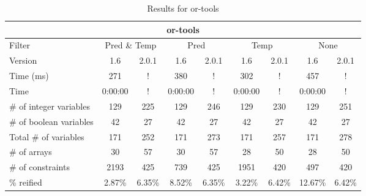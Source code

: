 \documentclass{standalone}
\begin{document}
\begin{table}[H]
\footnotesize
\centering
\begin{tabular}{lc|c|c|c|c|c|c|c}
\multicolumn{9}{c}{or-tools} \\ 
\hline\hline Filter & \multicolumn{2}{c|}{Pred \& Temp} &\multicolumn{2}{c|}{Pred}  & \multicolumn{2}{c|}{Temp} & \multicolumn{2}{c}{None} \\ 
\hline Version & 1.6 & 2.0.1 & 1.6 & 2.0.1 & 1.6 & 2.0.1 & 1.6 & 2.0.1 \\ 
Time (ms)               & 271 & ! & 380 & ! & 302 & ! & 457 & ! \\
Time                    & 0:00:00 & ! & 0:00:00 & ! & 0:00:00 & ! & 0:00:00 & ! \\ 
\# of integer variables & 129 & 225 & 129 & 246 & 129 & 230 & 129 & 251 \\ 
\# of boolean variables & 42 & 27 & 42 & 27 & 42 & 27 & 42 & 27 \\ 
Total \# of variables   & 171 & 252 & 171 & 273 & 171 & 257 & 171 & 278 \\ 
\# of arrays            & 30 & 57 & 30 & 57 & 28 & 50 & 28 & 50 \\ 
\# of constraints       & 2193 & 425 & 739 & 425 & 1951 & 420 & 497 & 420 \\ 
\% reified               & 2.87\% & 6.35\% & 8.52\% & 6.35\% & 3.22\% & 6.42\% & 12.67\% & 6.42\% \\ 
\end{tabular}
\caption{Results for or-tools}\label{tab:res_or}
\end{table}
\end{document}
